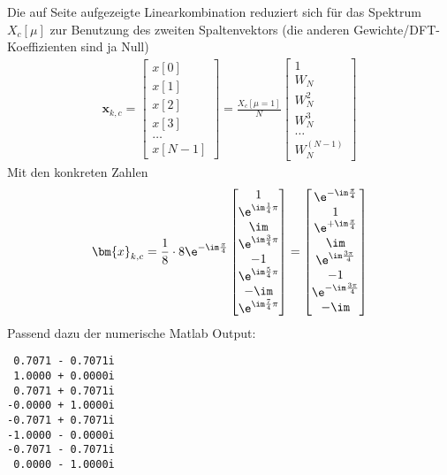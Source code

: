 \begin{ExCalc}
Die auf Seite \pageref{LinComb_for_IDFT} aufgezeigte Linearkombination reduziert
sich für das Spektrum $X_c[\mu]$ zur Benutzung des zweiten Spaltenvektors (die
anderen Gewichte/DFT-Koeffizienten sind ja Null)
\begin{align*}
\bm{x}_{k,c}=
\begin{bmatrix}
x[0]\\[1em]
x[1]\\[1em]
x[2]\\[1em]
x[3]\\[1em]
\dots\\[1em]
x[N-1]
\end{bmatrix}
=
\frac{X_c[\mu=1]}{N}
\begin{bmatrix}
1\\[1em]
W_N\\[1em]
W_N^2\\[1em]
W_N^3\\[1em]
\dots\\[1em]
W_N^{(N-1)}
\end{bmatrix}
\end{align*}
Mit den konkreten Zahlen
\begin{align}
\bm{x}_{k,c} = \frac{1}{8} \cdot 8 \e^{-\im\frac{\pi}{4}}
\begin{bmatrix}
1 \\  \e^{\im\frac{1}{4}\pi} \\ \im \\ \e^{\im\frac{3}{4}\pi}  \\ -1 \\ \e^{\im\frac{5}{4}\pi} \\ -\im \\ \e^{\im\frac{7}{4}\pi}
\end{bmatrix}=
\begin{bmatrix}
\e^{-\im\frac{\pi}{4}}\\
1\\
\e^{+\im\frac{\pi}{4}}\\
\im\\
\e^{\im\frac{3\pi}{4}}\\
-1\\
\e^{-\im\frac{3\pi}{4}}\\
-\im
\end{bmatrix}
\end{align}
Passend dazu der numerische Matlab Output:
\begin{verbatim}
 0.7071 - 0.7071i
 1.0000 + 0.0000i
 0.7071 + 0.7071i
-0.0000 + 1.0000i
-0.7071 + 0.7071i
-1.0000 - 0.0000i
-0.7071 - 0.7071i
 0.0000 - 1.0000i
\end{verbatim}

\end{ExCalc}
